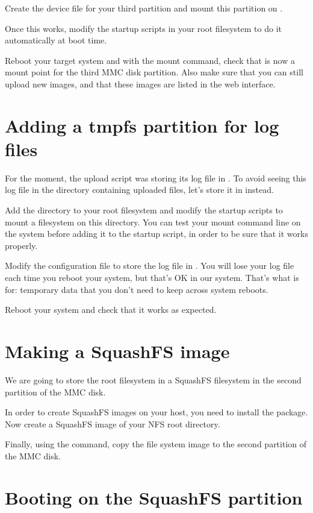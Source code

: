 Create the device file for your third partition and mount this partition
on .

Once this works, modify the startup scripts in your root filesystem
to do it automatically at boot time.

Reboot your target system and with the mount command, check that
 is now a mount point for the third MMC disk
partition. Also make sure that you can still upload new images, and
that these images are listed in the web interface.

\section{Adding a tmpfs partition for log files}

For the moment, the upload script was storing its log file in
. To avoid seeing this log file in
the directory containing uploaded files, let's store it in
 instead.

Add the  directory to your root filesystem and modify
the startup scripts to mount a  filesystem on this
directory. You can test your  mount command line on the
system before adding it to the startup script, in order to be sure
that it works properly.

Modify the  configuration file to store
the log file in . You will lose your log
file each time you reboot your system, but that's OK in our
system. That's what  is for: temporary data that you don't need
to keep across system reboots.

Reboot your system and check that it works as expected.

\section{Making a SquashFS image}

We are going to store the root filesystem in a SquashFS filesystem in
the second partition of the MMC disk.

In order to create SquashFS images on your host, you need to install
the  package. Now create a SquashFS image of your
NFS root directory.

Finally, using the  command, copy the file system image to
the second partition of the MMC disk.

\section{Booting on the SquashFS partition}

